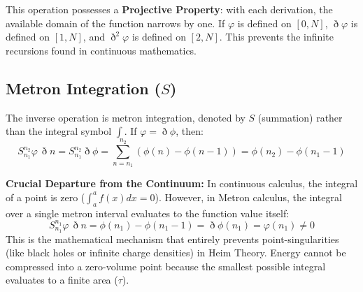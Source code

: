 \documentclass[11pt,a4paper,oneside]{article}
\newcommand{\ethop}{\eth}
\begin{document}
This operation possesses a \textbf{Projective Property}: with each derivation, the available domain of the function narrows by one. If $\varphi$ is defined on $[0, N]$, $\ethop \varphi$ is defined on $[1, N]$, and $\ethop^2 \varphi$ is defined on $[2, N]$. This prevents the infinite recursions found in continuous mathematics.

\subsection{Metron Integration (\texorpdfstring{$S$}{S})}

The inverse operation is metron integration, denoted by $S$ (summation) rather than the integral symbol $\int$. If $\varphi = \ethop \phi$, then:
\begin{equation}
    S_{n_1}^{n_2} \varphi \, \ethop n = S_{n_1}^{n_2} \ethop \phi = \sum_{n=n_1}^{n_2} (\phi(n) - \phi(n-1)) = \phi(n_2) - \phi(n_1-1)
\end{equation}

\textbf{Crucial Departure from the Continuum:} In continuous calculus, the integral of a point is zero ($\int_a^a f(x)dx = 0$). However, in Metron calculus, the integral over a single metron interval evaluates to the function value itself:
\begin{equation}
    S_{n_1}^{n_1} \varphi \, \ethop n = \phi(n_1) - \phi(n_1 - 1) = \ethop \phi(n_1) = \varphi(n_1) \neq 0
\end{equation}
This is the mathematical mechanism that entirely prevents point-singularities (like black holes or infinite charge densities) in Heim Theory. Energy cannot be compressed into a zero-volume point because the smallest possible integral evaluates to a finite area ($\tau$).
\end{document}
